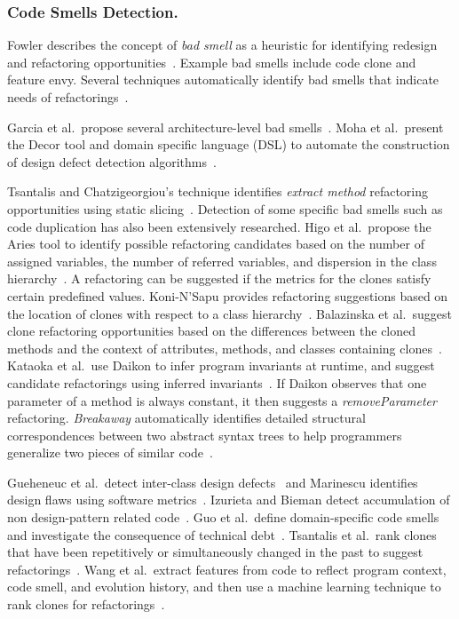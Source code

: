 \subsubsection{Code Smells Detection.} 
\label{sec:codesmell} 

Fowler describes the concept of {\em bad smell} as a heuristic for identifying redesign and refactoring opportunities~\cite{1999:RID}. Example bad smells include code clone and feature envy. Several techniques automatically identify bad smells that indicate needs of refactorings~\cite{Tsantalis2009:extractmethod,Tsantalis2009:movemethod,Tsantalis2008:jdeodorant}. 

Garcia et al.~propose several architecture-level bad smells~\cite{Garcia2009:badsmell}. Moha et al.~present the Decor tool and domain specific language (DSL) to automate the construction of design defect detection algorithms~\cite{Moha2009:designdefect}. 

Tsantalis and Chatzigeorgiou's technique identifies {\em extract method} refactoring opportunities using static slicing~\cite{Tsantalis2009:extractmethod}. Detection of some specific bad smells such as code duplication has also been extensively researched. Higo et al.~propose the Aries tool to identify possible refactoring candidates based on the number of assigned variables, the number of referred variables, and dispersion in the class hierarchy~\cite{Higo2004}. A refactoring can be suggested if the metrics for the clones satisfy certain predefined values. 
Koni-N'Sapu provides refactoring suggestions based on the location of clones with respect to a class hierarchy~\cite{koni_nsapu:ms01}. Balazinska et al.~suggest clone refactoring opportunities based on the differences between the cloned methods and the context of attributes, methods, and classes containing clones~\cite{Balazinska2000:ACA}. Kataoka et al.~use Daikon to infer program invariants at runtime, and suggest candidate refactorings using inferred invariants~\cite{Kataoka2001:ASP}. If Daikon observes that one parameter of a method is always constant, it then suggests a \emph{removeParameter} refactoring. {\it Breakaway} automatically identifies detailed structural correspondences between two abstract syntax trees to help programmers generalize two pieces of similar code~\cite{Cottrell:2007}. 

Gueheneuc et al.~detect inter-class design defects~\cite{Gueheneuc2001:designdefect} and Marinescu identifies design flaws using software metrics~\cite{Marinescu2004:designflaw}. Izurieta and Bieman detect accumulation of non design-pattern related code~\cite{Izurieta2007:grime}. Guo et al.~define domain-specific code smells~\cite{Guo2010:smell} and investigate the consequence of technical debt~\cite{Guo2011:td}. Tsantalis et al.~rank clones that have been repetitively or simultaneously changed in the past to suggest refactorings~\cite{Tsantalis2011:rankRefactoring}. Wang et al.~extract features from code to reflect program context, code smell, and evolution history, and then use a machine learning technique to rank clones for refactorings~\cite{Wang2014:recommendClones}.

